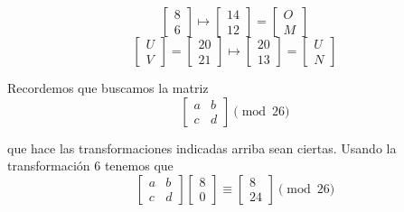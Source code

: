 \documentclass[letterpaper,10pt]{article}
\begin{document}
\begin{enumerate}
\begin{enumerate}
\begin{equation*}
            \begin{bmatrix} 8 \\ 6 \end{bmatrix} \mapsto
            \begin{bmatrix} 14 \\ 12 \end{bmatrix} =
            \begin{bmatrix} O \\ M \end{bmatrix}
        \end{equation*}
        \begin{equation*}
            \begin{bmatrix} U \\ V \end{bmatrix} =
            \begin{bmatrix} 20 \\ 21 \end{bmatrix} \mapsto
            \begin{bmatrix} 20 \\ 13 \end{bmatrix} =
            \begin{bmatrix} U \\ N \end{bmatrix}
        \end{equation*}
        
        Recordemos que buscamos la matriz
        \begin{equation*}
            \begin{bmatrix} a & b \\ c & d \end{bmatrix}  \pmod{26}
        \end{equation*}

        que hace las transformaciones indicadas arriba sean ciertas. Usando
        la transformación $6$ tenemos que
        \begin{equation*}
            \begin{bmatrix} a & b \\ c & d \end{bmatrix}
            \begin{bmatrix} 8 \\ 0 \end{bmatrix} \equiv
            \begin{bmatrix} 8 \\ 24 \end{bmatrix} \pmod{26}
        \end{equation*}
        

\end{enumerate}
\end{enumerate}
\end{document}
